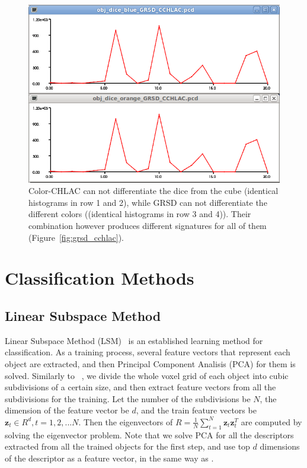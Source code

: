 \documentclass[conference]{sty/IEEEtran}
\begin{document}
\begin{figure}[htb!]
\begin{center}
    \includegraphics[width=.95\columnwidth]{figures/comparison/blue_vs_orange_dice_grsd.png}
  \caption{Color-CHLAC can not differentiate the dice from the cube (identical histograms in row 1 and 2), 
    while GRSD can not differentiate the different colors ((identical histograms in row 3 and 4)). 
    Their combination however produces different signatures for all of them (Figure~\ref{fig:grsd_cchlac}).}
  \label{fig:comparison}
\end{center}
\end{figure}

\section{Classification Methods}
\label{sec:classification}

\subsection{Linear Subspace Method}
\label{sec:subspace}
Linear Subspace Method (LSM)~\cite{watanabe1973} is an established learning method for classification. 
As a training process, several feature vectors that represent each object are extracted, 
and then Principal Component Analisis (PCA) for them is solved. 
Similarly to ~\cite{kanezaki2010icra}, we divide the whole voxel grid of each object into 
cubic subdivisions of a certain size, and then extract feature vectors from all the subdivisions for the training. 
Let the number of the subdivisions be $N$, the dimension of the feature vector be $d$, 
and the train feature vectors be $\bm{z}_t \in R^d, t=1,2,...N$. 
Then the eigenvectors of $R=\frac{1}{N} \sum^{N}_{t=1} \bm{z}_t \bm{z}_t^T$ are computed by solving the eigenvector problem. 
Note that we solve PCA for all the descriptors extracted from all the trained objects for the first step, 
and use top $d$ dimensions of the descriptor as a feature vector, in the same way as \cite{kanezaki2010icra}.
\end{document}
